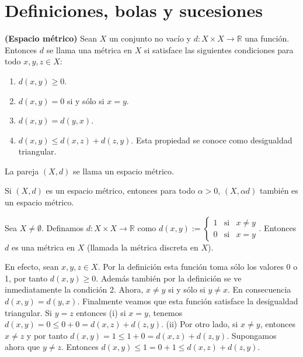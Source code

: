 \section{Definiciones, bolas y sucesiones}
\begin{definicion}\textbf{(Espacio métrico)}
Sean $X$ un conjunto no vacío y $d:X \times X \to \mathbb{R}$ una función. Entonces $d$ se llama una métrica en $X$ si satisface las siguientes condiciones para todo $x,y,z\in X$:
\begin{enumerate}
    \item $d(x,y)\geq 0$.
    \item $d(x,y)= 0$ si y sólo si $x=y$.
    \item $d(x,y)=d(y,x).$
    \item $d(x,y)\leq d(x,z)+d(z,y).$ Esta propiedad se conoce como desigualdad triangular.
\end{enumerate}
La pareja $(X,d)$ se llama un espacio métrico.
\end{definicion}
\begin{remark}
Si $(X,d)$ es un espacio métrico, entonces para todo $\alpha >0$, $(X,\alpha d)$ también es un espacio métrico.
\end{remark}
\begin{example}
Sea $X\ne \emptyset$. Definamos $d:X\times X \to \mathbb{R}$ como $d(x,y):= \left\{ \begin{array}{rcl}
    1 & \text{si} & x\neq y \\
     0 & \text{si} & x= y
\end{array} \right. .$ Entonces $d$ es una métrica en $X$ (llamada la métrica discreta en $X$).
\end{example}
En efecto, sean $x,y,z \in X$. Por la definición esta función toma sólo los valores 0 o 1, por tanto $d(x,y)\geq 0$. Además también por la definición se ve inmediatamente la condición 2. Ahora,  $x\neq y$ si y sólo si $y\neq x$. En consecuencia $d(x,y)=d(y,x)$. Finalmente veamos que esta función satisface la desigualdad triangular. Si $y=z$ entonces (i) si $x=y$, tenemos $d(x,y)=0\leq 0+0=d(x,z)+d(z,y)$. (ii)
Por otro lado, si $x\neq y$, entonces $x\neq z$ y por tanto $d(x,y)=1\leq 1+0 =d(x,z)+d(z,y)$.  Supongamos ahora que $y\neq z$. Entonces $d(x,y)\leq 1 = 0+1 \leq d(x,z)+d(z,y).$

